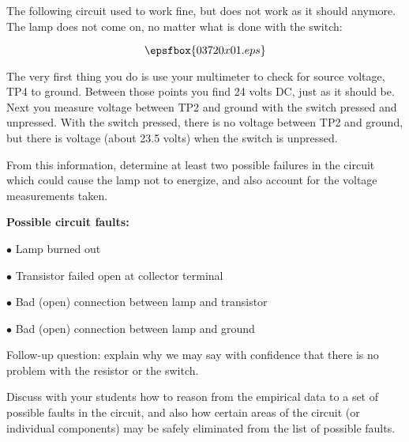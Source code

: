 

The following circuit used to work fine, but does not work as it should anymore.  The lamp does not come on, no matter what is done with the switch:

$$\epsfbox{03720x01.eps}$$

The very first thing you do is use your multimeter to check for source voltage, TP4 to ground.  Between those points you find 24 volts DC, just as it should be.  Next you measure voltage between TP2 and ground with the switch pressed and unpressed.  With the switch pressed, there is no voltage between TP2 and ground, but there is voltage (about 23.5 volts) when the switch is unpressed.

\vskip 10pt

From this information, determine at least two possible failures in the circuit which could cause the lamp not to energize, and also account for the voltage measurements taken.







\noindent
{\bf Possible circuit faults:}

\medskip
\item{$\bullet$} Lamp burned out
\item{$\bullet$} Transistor failed open at collector terminal
\item{$\bullet$} Bad (open) connection between lamp and transistor
\item{$\bullet$} Bad (open) connection between lamp and ground
\medskip

\vskip 10pt

Follow-up question: explain why we may say with confidence that there is no problem with the resistor or the switch.







Discuss with your students how to reason from the empirical data to a set of possible faults in the circuit, and also how certain areas of the circuit (or individual components) may be safely eliminated from the list of possible faults.




